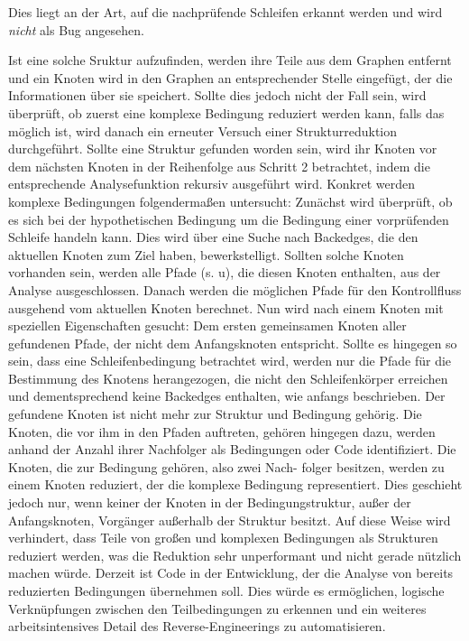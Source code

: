 \documentclass[11pt]{article} %
\begin{document}
\begin{enumerate}
\begin{enumerate}
{					Dies liegt an der Art, auf die nachprüfende Schleifen
					erkannt werden und wird \textit{nicht} als Bug angesehen.
				}
		\end{enumerate}
		Ist eine solche Sruktur aufzufinden, werden ihre Teile aus dem Graphen entfernt und ein
		Knoten wird in den Graphen an entsprechender Stelle eingefügt, der
		die Informationen über sie speichert. Sollte dies jedoch nicht der Fall
		sein, wird überprüft, ob zuerst eine komplexe Bedingung reduziert
		werden kann, falls das möglich ist, wird danach ein erneuter Versuch einer
		Strukturreduktion durchgeführt. Sollte eine Struktur gefunden worden
		sein, wird ihr Knoten vor dem nächsten Knoten in der Reihenfolge aus
		Schritt 2 betrachtet, indem die entsprechende Analysefunktion rekursiv
		ausgeführt wird. Konkret werden komplexe Bedingungen
		folgendermaßen untersucht: Zunächst wird überprüft, ob es sich bei
		der hypothetischen Bedingung um die Bedingung einer vorprüfenden
		Schleife handeln kann. Dies wird über eine Suche nach Backedges, die den
		aktuellen Knoten zum Ziel haben, bewerkstelligt. Sollten solche Knoten
		vorhanden sein, werden alle Pfade (s. u), die diesen Knoten enthalten,
		aus der Analyse ausgeschlossen. Danach werden die möglichen Pfade für den
		Kontrollfluss ausgehend vom aktuellen Knoten berechnet.  Nun wird
		nach einem Knoten mit speziellen Eigenschaften gesucht: Dem ersten
		gemeinsamen Knoten aller gefundenen Pfade, der nicht dem
		Anfangsknoten entspricht. Sollte es hingegen so sein, dass eine
		Schleifenbedingung betrachtet wird, werden nur die Pfade für die
		Bestimmung des Knotens herangezogen, die nicht den Schleifenkörper
		erreichen und dementsprechend keine Backedges enthalten, wie anfangs beschrieben.
		Der gefundene Knoten ist nicht mehr zur Struktur und Bedingung gehörig.
		Die Knoten, die vor ihm in den Pfaden auftreten, gehören hingegen
		dazu, werden anhand der Anzahl ihrer Nachfolger als Bedingungen oder 
		Code identifiziert. Die Knoten, die zur Bedingung gehören, also zwei Nach-
		folger besitzen, werden zu einem Knoten reduziert, der die komplexe Bedingung
		representiert.
		Dies geschieht jedoch nur, wenn keiner der Knoten in der Bedingungstruktur,
		außer der Anfangsknoten, Vorgänger außerhalb der Struktur besitzt.
		Auf diese Weise wird verhindert, dass Teile von großen und komplexen Bedingungen
		als Strukturen reduziert werden, was die Reduktion sehr unperformant und nicht
		gerade nützlich machen würde. Derzeit ist Code in der Entwicklung, der die Analyse
		von bereits reduzierten Bedingungen übernehmen soll. Dies würde es ermöglichen,
		logische Verknüpfungen zwischen den Teilbedingungen zu erkennen und ein weiteres
		arbeitsintensives Detail des Reverse-Engineerings zu automatisieren.
\end{enumerate}
\end{document}
